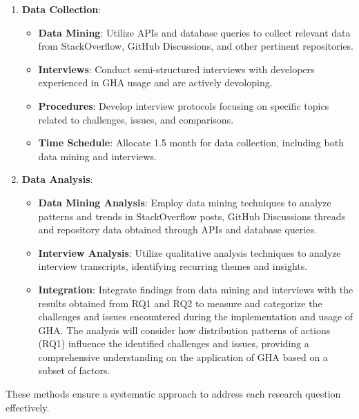 \documentclass[conference]{IEEEtran}
\begin{document}
\begin{enumerate}
    \item \textbf{Data Collection}:\\
    \begin{itemize}
        \item \textbf{Data Mining}: Utilize APIs and database queries to collect relevant data from StackOverflow, GitHub Discussions, and other pertinent repositories.
        \item \textbf{Interviews}: Conduct semi-structured interviews with developers experienced in GHA usage and are actively devoloping.
        \item \textbf{Procedures}: Develop interview protocols focusing on specific topics related to challenges, issues, and comparisons.
        \item \textbf{Time Schedule}: Allocate 1.5 month for data collection, including both data mining and interviews.\\
    \end{itemize}
    
    \item \textbf{Data Analysis}:\\
    \begin{itemize}
        \item \textbf{Data Mining Analysis}: Employ data mining techniques to analyze patterns and trends in StackOverflow posts, GitHub Discussions threads and repository data obtained through APIs and database queries.
        \item \textbf{Interview Analysis}: Utilize qualitative analysis techniques to analyze interview transcripts, identifying recurring themes and insights.
        \item \textbf{Integration}: Integrate findings from data mining and interviews with the results obtained from RQ1 and RQ2 to measure and categorize the challenges and issues encountered during the implementation and usage of GHA. The analysis will consider how distribution patterns of actions (RQ1) influence the identified challenges and issues, providing a comprehensive understanding on the application of GHA based on a subset of factors.\\
    \end{itemize}
\end{enumerate}

These methods ensure a systematic approach to address each research question effectively.\\
\end{document}
